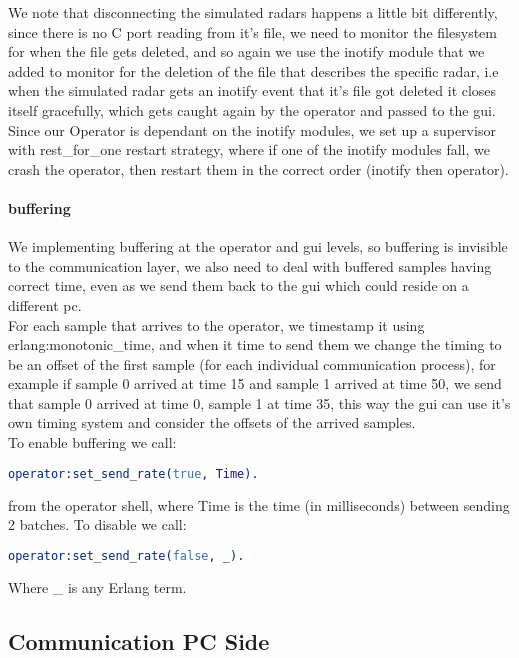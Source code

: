 \documentclass{article}
\begin{document}
We note that disconnecting the simulated radars happens a little bit differently, since there is no C port reading from it's file, we need to monitor the filesystem for when the file gets deleted, and so again we use the inotify module that we added to monitor for the deletion of the file that describes the specific radar, i.e when the simulated radar gets an inotify event that it's file got deleted it closes itself gracefully, which gets caught again by the operator and passed to the gui.\\
Since our Operator is dependant on the inotify modules, we set up a supervisor with rest\_for\_one restart strategy, where if one of the inotify modules fall, we crash the operator, then restart them in the correct order (inotify then operator).

\paragraph{buffering}
We implementing buffering at the operator and gui levels, so buffering is invisible to the communication layer, we also need to deal with buffered samples having correct time, even as we send them back to the gui which could reside on a different pc.\\
For each sample that arrives to the operator, we timestamp it using erlang:monotonic\_time, and when it time to send them we change the timing to be an offset of the first sample (for each individual communication process), for example if sample 0 arrived at time 15 and sample 1 arrived at time 50, we send that sample 0 arrived at time 0, sample 1 at time 35, this way the gui can use it's own timing system and consider the offsets of the arrived samples.\\
To enable buffering we call:
\begin{lstlisting}[language=Erlang]
   operator:set_send_rate(true, Time).
\end{lstlisting}
from the operator shell, where Time is the time (in milliseconds) between sending 2 batches.
To disable we call:
\begin{lstlisting}[language=Erlang]
   operator:set_send_rate(false, _).
\end{lstlisting}
Where \_ is any Erlang term.

\subsection{Communication PC Side}
\end{document}
